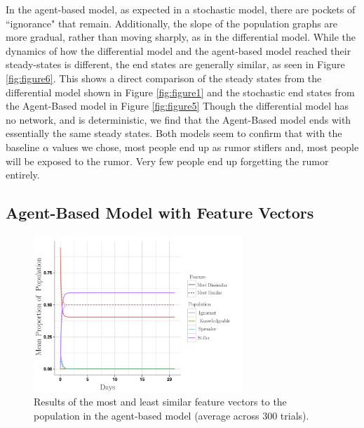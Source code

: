 In the agent-based model, as expected in a stochastic model, there are pockets of ``ignorance" that remain. Additionally, the slope of the population graphs are more gradual, rather than moving sharply, as in the differential model. While the dynamics of how the differential model and the agent-based model reached their steady-states is  different, the end states are generally similar, as seen in Figure \ref{fig:figure6}. This shows a direct comparison of the steady states from the differential model shown in Figure \ref{fig:figure1} and the stochastic end states from the Agent-Based model in Figure \ref{fig:figure5}  Though the differential model has no network, and is deterministic, we find that the Agent-Based model ends with essentially the same steady states. Both models seem to confirm that with the baseline $\alpha$ values we chose, most people end up as rumor stiflers and, most people will be exposed to the rumor. Very few people end up forgetting the rumor entirely. 

\subsection{Agent-Based Model with Feature Vectors}
\label{subsec:featvect}

\begin{figure}[H]
\captionsetup{width=0.8\textwidth}
\centering
    \includegraphics[width=0.7\textwidth]{figure7}
  \caption{ Results of the most and least similar feature vectors to the population in the agent-based model (average across $ 300 $ trials). }
  \label{fig:figure7}
\end{figure}

